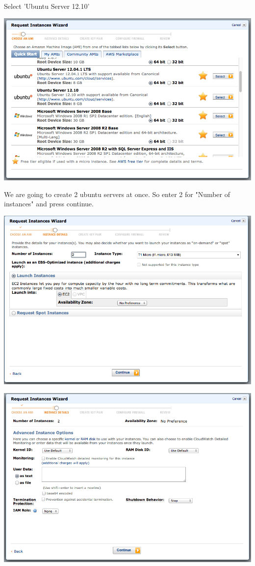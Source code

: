 Select 'Ubuntu Server 12.10'

\includegraphics[scale=0.30]{ec2-2.png}

We are going to create 2 ubuntu servers at once. So enter 2 for "Number of instances" and press continue.

\includegraphics[scale=0.30]{ec2-3.png}

\includegraphics[scale=0.30]{ec2-4.png}

